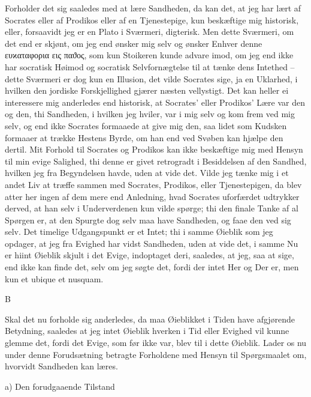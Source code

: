 \documentclass[12pt,a4paper]{article}
\begin{document}
Forholder det sig saaledes med at lære Sandheden, da kan det, at jeg har lært af Socrates eller af Prodikos eller af en Tjenestepige, kun beskæftige mig historisk, eller, forsaavidt jeg er en Plato i Sværmeri, digterisk. Men dette Sværmeri, om det end er skjønt, om jeg end ønsker mig selv og ønsker Enhver denne ευϰαταφορια εις παϑος, som kun Stoikeren kunde advare imod, om jeg end ikke har socratisk Høimod og socratisk Selvfornægtelse til at tænke dens Intethed – dette Sværmeri er dog kun en Illusion, det vilde Socrates sige, ja en Uklarhed, i hvilken den jordiske Forskjellighed gjærer næsten vellystigt. Det kan heller ei interessere mig anderledes end historisk, at Socrates' eller Prodikos' Lære var den og den, thi Sandheden, i hvilken jeg hviler, var i mig selv og kom frem ved mig selv, og end ikke Socrates formaaede at give mig den, saa lidet som Kudsken formaaer at trække Hestens Byrde, om han end ved Svøben kan hjælpe den dertil. Mit Forhold til Socrates og Prodikos kan ikke beskæftige mig med Hensyn til min evige Salighed, thi denne er givet retrogradt i Besiddelsen af den Sandhed, hvilken jeg fra Begyndelsen havde, uden at vide det. Vilde jeg tænke mig i et andet Liv at træffe sammen med Socrates, Prodikos, eller Tjenestepigen, da blev atter her ingen af dem mere end Anledning, hvad Socrates uforfærdet udtrykker derved, at han selv i Underverdenen kun vilde spørge; thi den finale Tanke af al Spørgen er, at den Spurgte dog selv maa have Sandheden, og faae den ved sig selv. Det timelige Udgangspunkt er et Intet; thi i samme Øieblik som jeg opdager, at jeg fra Evighed har vidst Sandheden, uden at vide det, i samme Nu er hiint Øieblik skjult i det Evige, indoptaget deri, saaledes, at jeg, saa at sige, end ikke kan finde det, selv om jeg søgte det, fordi der intet Her og Der er, men kun et ubique et nusquam.

B

Skal det nu forholde sig anderledes, da maa Øieblikket i Tiden have afgjørende Betydning, saaledes at jeg intet Øieblik hverken i Tid eller Evighed vil kunne glemme det, fordi det Evige, som før ikke var, blev til i dette Øieblik. Lader os nu under denne Forudsætning betragte Forholdene med Hensyn til Spørgsmaalet om, hvorvidt Sandheden kan læres.

a) Den forudgaaende Tilstand
\end{document}
